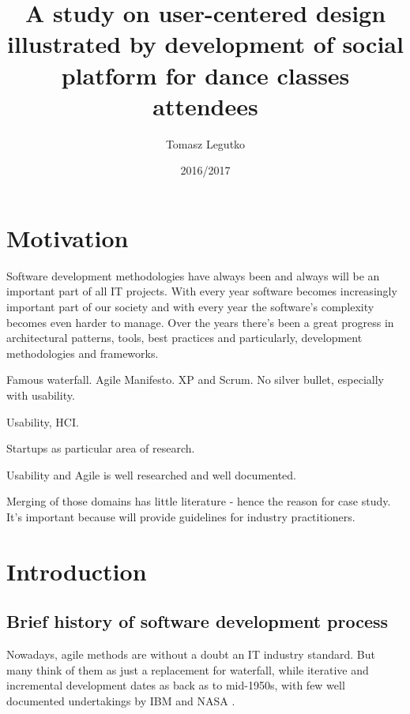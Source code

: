 \documentclass{article}
\title{A study on user-centered design illustrated by development of social platform for dance classes attendees}
\author{Tomasz Legutko}
\date{2016/2017}
\begin{document}
\maketitle
\tableofcontents
\section{Motivation} %
Software development methodologies have always been and always will be an important part of all IT projects. With every year software becomes increasingly important part of our society and with every year the software's complexity becomes even harder to manage. Over the years there's been a great progress in architectural patterns, tools, best practices and particularly, development methodologies and frameworks.

Famous waterfall. Agile Manifesto. XP and Scrum. No silver bullet, especially with usability.

Usability, HCI.

Startups as particular area of research. \cite{paternoster2014software}

Usability and Agile is well researched and well documented.

Merging of those domains has little literature - hence the reason for case study. It's important because will provide guidelines for industry practitioners.


\section{Introduction} %
\subsection{Brief history of software development process}
Nowadays, agile methods are without a doubt an IT industry standard. But many think of them as just a replacement for waterfall, while iterative and incremental development dates as back as to mid-1950s, with few well documented undertakings by IBM and NASA \cite{larman2003iterative}.
\end{document}
